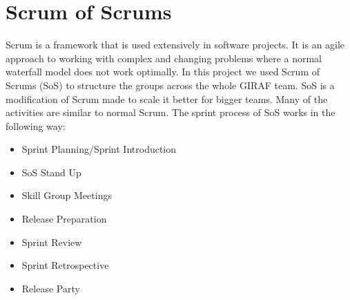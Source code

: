 \section{Scrum of Scrums}\label{scrum-of-scrums}
Scrum is a framework that is used extensively in software projects.
It is an agile approach to working with complex and changing problems where a normal waterfall model does not work optimally.
In this project we used Scrum of Scrums (SoS) to structure the groups across the whole GIRAF team.
SoS is a modification of Scrum made to scale it better for bigger teams.
Many of the activities are similar to normal Scrum.
The sprint process of SoS works in the following way:

\begin{itemize}
    \item Sprint Planning/Sprint Introduction
    \item SoS Stand Up
    \item Skill Group Meetings
    \item Release Preparation
    \item Sprint Review
    \item Sprint Retrospective
    \item Release Party
\end{itemize}

